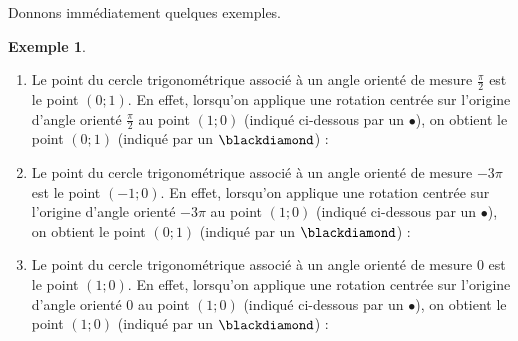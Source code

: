 \documentclass[a4paper,fontsize=13pt]{scrreprt}
\theoremstyle{plain}
\theoremstyle{definition}
\newtheorem{exe}[subsection]{Exemple}
\newcommand {\axes} {
	\draw[thick, ->] (\xmin,0) -- (\xmax+1,0);
	\draw[thick, ->] (0,\ymin) -- (0,\ymax+1);
	\draw (0,\ymax+0.5) node [left] {$y$};
	\draw (\xmax+0.5, 0) node [below] {$x$};
	\draw[thick] (-0.15,1)--(0.15,1) (1,-0.15)--(1,0.15);
	\draw (0,1)node[left]{$1$} (1,0)node[below]{$1$};
}
\begin{document}
Donnons immédiatement quelques exemples.

\begin{exe} ~\\
\begin{enumerate}
\item Le point du cercle trigonométrique associé à un angle orienté de mesure $\frac{\pi}{2}$ est le point $(0;1)$. En effet, lorsqu'on applique une rotation centrée sur l'origine d'angle orienté $\frac{\pi}{2}$ au point $(1;0)$ (indiqué ci-dessous par un $\bullet$), on obtient le point $(0;1)$ (indiqué par un $\blackdiamond$) :
\begin{center}
\end{center}
\item Le point du cercle trigonométrique associé à un angle orienté de mesure $-3\pi$ est le point $(-1;0)$. En effet, lorsqu'on applique une rotation centrée sur l'origine d'angle orienté $-3\pi$ au point $(1;0)$ (indiqué ci-dessous par un $\bullet$), on obtient le point $(0;1)$ (indiqué par un $\blackdiamond$) :
\begin{center}
\end{center}
\item Le point du cercle trigonométrique associé à un angle orienté de mesure $0$ est le point $(1;0)$. En effet, lorsqu'on applique une rotation centrée sur l'origine d'angle orienté $0$ au point $(1;0)$ (indiqué ci-dessous par un $\bullet$), on obtient le point $(1;0)$ (indiqué par un $\blackdiamond$) :
\begin{center}
\end{center}
\end{enumerate}
\end{exe}
\end{document}
